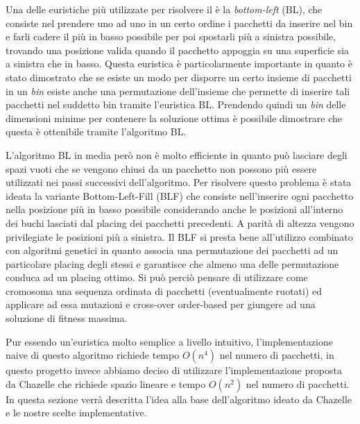 Una delle euristiche più utilizzate per risolvere il \ddbpp{} è la \emph{bottom-left} (BL), che consiste nel prendere uno ad uno in un certo ordine i pacchetti da inserire nel bin e farli cadere il più in basso possibile per poi spostarli più a sinistra possibile, trovando una posizione valida quando il pacchetto appoggia su una superficie sia a sinistra che in basso. Questa euristica è particolarmente importante in quanto è stato dimostrato che se esiste un modo per disporre un certo insieme di pacchetti in un \emph{bin} esiste anche una permutazione dell'insieme che permette di inserire tali pacchetti nel suddetto bin tramite l'euristica BL. Prendendo quindi un \emph{bin} delle dimensioni minime per contenere la soluzione ottima è possibile dimostrare che questa è ottenibile tramite l'algoritmo BL.

L'algoritmo BL in media però non è molto efficiente in quanto può lasciare degli spazi vuoti che se vengono chiusi da un pacchetto non possono più essere utilizzati nei passi successivi dell'algoritmo. Per risolvere questo problema è stata ideata la variante Bottom-Left-Fill (BLF) che consiste nell'inserire ogni pacchetto nella posizione più in basso possibile considerando anche le posizioni all'interno dei buchi lasciati dal placing dei pacchetti precedenti. A parità di altezza vengono privilegiate le posizioni più a sinistra. Il BLF si presta bene all'utilizzo combinato con algoritmi genetici in quanto associa una permutazione dei pacchetti ad un particolare placing degli stessi e garantisce che almeno una delle permutazione conduca ad un placing ottimo. Si può perciò pensare di utilizzare come cromosoma una sequenza ordinata di pacchetti (eventualmente ruotati) ed applicare ad essa mutazioni e cross-over order-based per giungere ad una soluzione di fitness massima.

Pur essendo un'euristica molto semplice a livello intuitivo, l'implementazione naive di questo algoritmo richiede tempo $O(n^4)$ nel numero di pacchetti, in questo progetto invece abbiamo deciso di utilizzare l'implementazione proposta da Chazelle \cite{chazelleBL} che richiede spazio lineare e tempo $O(n^2)$ nel numero di pacchetti. In questa sezione verrà descritta l'idea alla base dell'algoritmo ideato da Chazelle e le nostre scelte implementative. 

